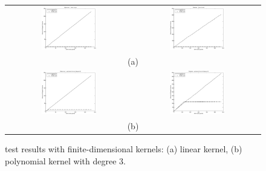 \documentclass[10pt,twocolumn,letterpaper]{article}
\begin{document}
\begin{figure}[!htbp]
  \begin{center}
    \begin{tabular}{cc}
       \includegraphics[width=0.45\textwidth]{Haberman_lin} &
       \includegraphics[width=0.45\textwidth]{Diabetes_lin} \\
       \multicolumn{2}{c}{(a)} \\
       \includegraphics[width=0.45\textwidth]{Haberman_poly3} &
       \includegraphics[width=0.45\textwidth]{Diabetes_poly3} \\
       \multicolumn{2}{c}{(b)} \\
    \end{tabular}
  \end{center}
  \caption{\label{fig:finite} test results with finite-dimensional
  kernels: (a) linear kernel, (b) polynomial kernel with degree $3$.}
\end{figure}
\end{document}
